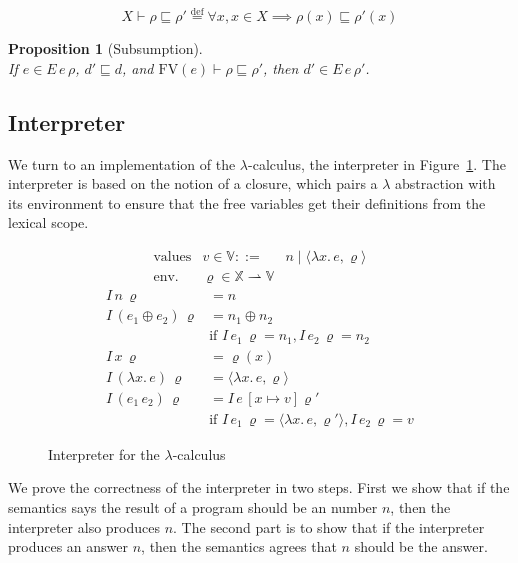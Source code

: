 \documentclass{tufte-handout}
\newcommand{\defeq}[0]{\overset{\mathrm{def}}{=}}
\newcommand{\LAM}[1]{\lambda #1.\,}
\newcommand{\pto}[0]{\rightharpoonup}
\newcommand{\VAR}[0]{\mathbb{X}}
\newtheorem{proposition}[theorem]{Proposition}
\begin{document}
\[
X \vdash \rho \sqsubseteq \rho' \defeq
  \forall x, x \in X \implies \rho(x) \sqsubseteq \rho'(x)
\]

\begin{proposition}[Subsumption]\ \\
  \label{prop:sub}
  If $e \in E\,e\,\rho$, $d' \sqsubseteq d$,
  and $\mathrm{FV}(e) \vdash \rho \sqsubseteq \rho'$,
  then $d' \in E\,e\,\rho'$.
\end{proposition}

\subsection{Interpreter}

We turn to an implementation of the $\lambda$-calculus, the
interpreter in Figure~\ref{fig:interp-lambda}. The interpreter is
based on the notion of a closure, which pairs a $\lambda$ abstraction
with its environment to ensure that the free variables get their
definitions from the lexical scope.

\begin{figure}
\[
\begin{array}{lrl}
 \text{values} & v \in \mathbb{V} ::= & n \mid \langle \LAM{x}e, \varrho \rangle \\
 \text{env.} & \varrho \in \VAR \pto \mathbb{V} 
\end{array}
\]
\begin{align*}
  I\,n\,\varrho &= n \\
  I\,(e_1 \oplus e_2)\,\varrho &= n_1 \oplus n_2 \\
      & \text{if } I\,e_1\,\varrho = n_1, I\,e_2\,\varrho = n_2 \\
  I\,x\,\varrho &= \varrho(x) \\
  I\,(\LAM{x}e)\,\varrho &= \langle \LAM{x}e, \varrho \rangle \\
  I\,(e_1\,e_2)\,\varrho &=  I\,e\,[x\mapsto v]\varrho'\\
  & \text{if } I\,e_1\,\varrho = \langle \LAM{x}e,\varrho' \rangle,
      I\,e_2\,\varrho = v
\end{align*}

\caption{Interpreter for the $\lambda$-calculus}
\label{fig:interp-lambda}
\end{figure}

We prove the correctness of the interpreter in two steps.  First we
show that if the semantics says the result of a program should be an
number $n$, then the interpreter also produces $n$. The second part is
to show that if the interpreter produces an answer $n$, then the
semantics agrees that $n$ should be the answer.
\end{document}
